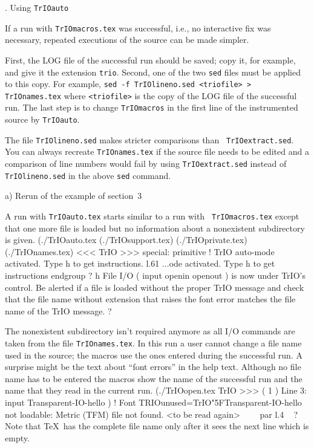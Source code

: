 . Using {\tt TrIOauto}

If a run with {\tt TrIOmacros.tex} was successful, i.e., no interactive
fix was necessary, repeated executions of the source can be made
simpler.

First, the LOG file of the successful run should be saved; copy it, for
example, and give it the extension {\tt trio}. Second, one of the two
{\tt sed} files must be applied to this copy. For example, {\tt sed -f
TrIOlineno.sed <triofile> > TrIOnames.tex} where {\tt<triofile>} is
the copy of the LOG file of the successful run. The last step is to
change {\tt TrIOmacros} in the first line of the instrumented source
by {\tt TrIOauto}.

The file {\tt TrIOlineno.sed} makes stricter comparisons than {\tt
TrIOextract.sed}. You can always recreate {\tt TrIOnames.tex} if the
source file needs to be edited and a comparison of line numbers would
fail by using {\tt TrIOextract.sed} instead of {\tt TrIOlineno.sed} in
the above {\tt sed} command.

\beginsection \rm a) Rerun of the example of section~3

A run with {\tt TrIOauto.tex} starts similar to a run with {\tt
TrIOmacros.tex} except that one more file is loaded but no information
about a nonexistent subdirectory is given.
\beginverbatim
(./TrIOauto.tex (./TrIOsupport.tex) (./TrIOprivate.tex) (./TrIOnames.tex)\parni
<<< TrIO >>> \bs special: primitive\parni
! TrIO auto-mode activated. Type h to get instructions.\parni
l.61 ...ode activated. Type h to get instructions\ccb\parni
\fortyspaces\tenspaces\bs endgroup\parni
? h\parni
File I/O ( \bs input \bs openin \bs openout ) is now under TrIO's control.\parni
Be alerted if a file is loaded without the proper TrIO message\parni
and check that the file name without extension that raises\parni
the font error matches the file name of the TrIO message.\parni
? \endverbatim

The nonexistent subdirectory isn't required anymore as all I/O
commands are taken from the file {\tt TrIOnames.tex}. In this run a
user cannot change a file name used in the source; the macros use the
ones entered during the successful run. A surprise might be the text
about ``font errors'' in the help text. Although no file name has to
be entered the macros show the name of the successful run and the name
that they read in the current run.
\beginverbatim
(./TrIOopen.tex\parni
TrIO >>> ( 1 ) Line 3: input Transparent-IO-hello \parni
)\parni
! Font \bs TRIOunused=TrIO\char"5FTransparent-IO-hello not loadable: Metric (TFM) file not found.\parni
<to be read again> \parni
\tenspaces\fivespaces\ \ \ \ \bs par\parni
l.4 \parni
\ \parni
? \endverbatim
\noindent
Note that \TeX\ has the complete file name only after it sees the next
line which is empty.

